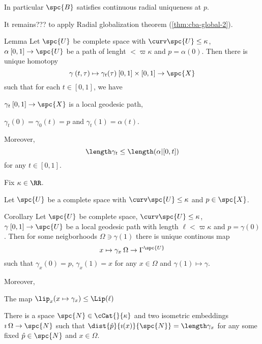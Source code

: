 In particular $\spc{B}$ satisfies continuous radial uniqueness at $p$.

It remains??? to apply Radial globalization theorem (\ref{thm:cba-global-2}).\qeds





\begin{thm}{Lemma}
Let $\spc{U}$ be complete space with $\curv\spc{U}\le\kappa$,
$\alpha\:[0,1]\to\spc{U}$ be a path of lenght $<\varpi\kappa$
and $p=\alpha(0)$.
Then there is unique homotopy 
$$\gamma\:(t,\tau)\mapsto\gamma_t(\tau)\:[0,1]\times[0,1]\to\spc{X}$$
such that for each $t\in [0,1]$, we have
\begin{subthm}{}
$\gamma_t\:[0,1]\to\spc{X}$ is a local geodesic path, 
\end{subthm}
\begin{subthm}{}
$\gamma_t(0)=\gamma_0(t)=p$ and $\gamma_t(1)=\alpha(t)$.
\end{subthm}


Moreover, 
$$\length\gamma_t\le\length(\alpha|[0,t])$$ 
for any $t\in[0,1]$.
\end{thm}

Fix $\kappa\in \RR$.

Let $\spc{U}$ be a complete space with $\curv\spc{U}\le\kappa$ and $p\in\spc{X}$.




\begin{thm}{Corollary}\label{cor:loc-family-one-point}
Let $\spc{U}$ be complete space,
$\curv\spc{U}\le\kappa$, 
$\gamma\:[0,1]\to\spc{U}$ be a local geodesic path with length $\ell<\varpi\kappa$
and $p=\gamma(0)$.
Then for some neigborhoods $\Omega\ni\gamma(1)$ 
there is unique continous map
$$x\mapsto\gamma_x\:\Omega\to\Gamma^\spc{U}$$
such that $\gamma_{x}(0)=p$, $\gamma_{x}(1)=x$ for any $x\in\Omega$
and $\gamma(1)\mapsto\gamma$.


Moreover, 
\begin{subthm}{}
The map $\lip_x(x\mapsto\gamma_x)\le \Lip(\ell)$
\end{subthm}



\begin{subthm}{}
There is a space $\spc{N}\in\cCat{}{\kappa}$ 
and two isometric embeddings
$\imath\:\Omega\to \spc{N}$ 
such that 
$\dist{\hat p}{\imath(x)}{\spc{N}}=\length\gamma_x$
for any some fixed $\hat p\in\spc{N}$ and $x\in \Omega$.
\end{subthm}
\end{thm}


